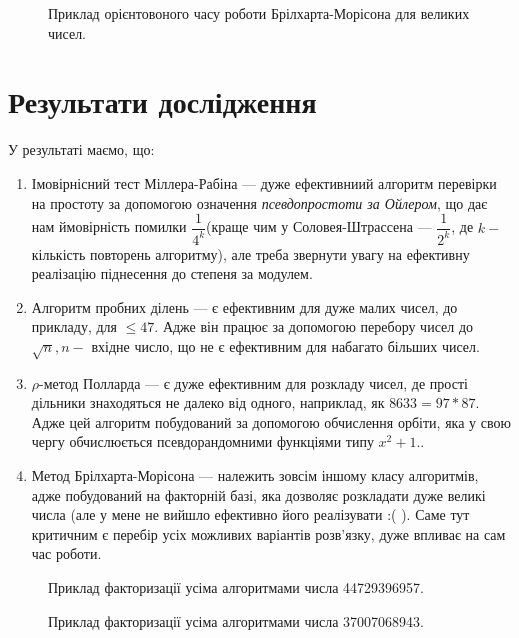 \begin{figure}[h]
			\caption{Приклад орієнтовоного часу роботи Брілхарта-Морісона для великих чисел.}
			\label{fig:image}
		\end{figure}

\section{Результати дослідження}
У результаті маємо, що:
\begin{enumerate}
\item Імовірнісний тест Міллера-Рабіна --- дуже ефективниий алгоритм перевірки на простоту за допомогою означення \textit{псевдопростоти за Ойлером}, що дає нам ймовірність помилки $\dfrac{1}{4^{k}}$(краще чим у Соловея-Штрассена --- $\dfrac{1}{2^{k}}$, де $k - $кількість повторень алгоритму), але треба звернути увагу на ефективну реалізацію піднесення до степеня за модулем.
\item Алгоритм пробних ділень --- є ефективним для дуже малих чисел, до прикладу, для $\leqslant47$. Адже він працює за допомогою перебору чисел до $\sqrt{n}, n -$ вхідне число, що не є ефективним для набагато більших чисел.
\item $\rho$-метод Полларда --- є дуже ефективним для розкладу чисел, де прості дільники знаходяться не далеко від одного, наприклад, як $8633 = 97*87$. Адже цей алгоритм побудований за допомогою обчислення орбіти, яка у свою чергу обчислюється псевдорандомними функціями типу $x^{2}+1$..
\item Метод Брілхарта-Морісона --- належить зовсім іншому класу алгоритмів, адже побудований на факторній базі, яка дозволяє розкладати дуже великі числа (але у мене не вийшло ефективно його реалізувати :( ). Саме тут критичним є перебір усіх можливих варіантів розв'язку, дуже впливає на сам час роботи.
\end{enumerate}

\begin{figure}[h]
			\caption{Приклад факторизації усіма алгоритмами числа 44729396957.}
			\label{fig:image}
		\end{figure}
		
\begin{figure}[h]
			\caption{Приклад факторизації усіма алгоритмами числа 37007068943.}
			\label{fig:image}
		\end{figure}


